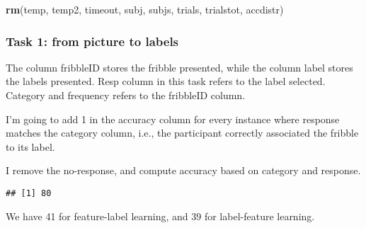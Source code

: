 \documentclass[
]{article}
\newenvironment{Shaded}{\begin{snugshade}}{\end{snugshade}}
\newcommand{\KeywordTok}[1]{\textcolor[rgb]{0.13,0.29,0.53}{\textbf{#1}}}
\newcommand{\NormalTok}[1]{#1}
\newcommand{\OperatorTok}[1]{\textcolor[rgb]{0.81,0.36,0.00}{\textbf{#1}}}
\newcommand{\StringTok}[1]{\textcolor[rgb]{0.31,0.60,0.02}{#1}}
\begin{document}
\begin{Shaded}
\begin{Highlighting}[]
\KeywordTok{rm}\NormalTok{(temp, temp2, timeout, subj, subjs, trials, trialstot, accdistr)}
\end{Highlighting}
\end{Shaded}

\hypertarget{task-1-from-picture-to-labels}{%
\subsubsection{Task 1: from picture to
labels}\label{task-1-from-picture-to-labels}}

The column fribbleID stores the fribble presented, while the column
label stores the labels presented. Resp column in this task refers to
the label selected. Category and frequency refers to the fribbleID
column.

I'm going to add 1 in the accuracy column for every instance where
response matches the category column, i.e., the participant correctly
associated the fribble to its label.

I remove the no-response, and compute accuracy based on category and
response.

\begin{Shaded}
\end{Shaded}

\begin{verbatim}
## [1] 80
\end{verbatim}

\begin{Shaded}
\end{Shaded}

We have 41 for feature-label learning, and 39 for label-feature
learning.
\end{document}
